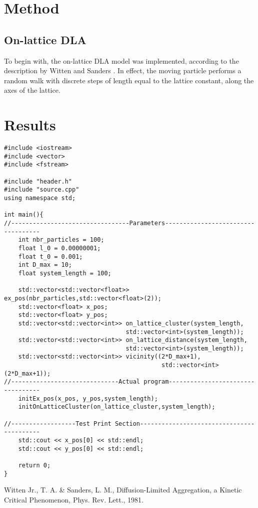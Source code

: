 \documentclass{article}
\begin{document}
\section {Method}
\subsection{On-lattice DLA}
To begin with, the on-lattice DLA model was implemented, according to the description by Witten and Sanders \cite{witten_and_sanders81}. In effect, the moving particle performs a random walk with discrete steps of length equal to the lattice constant, along the axes of the lattice. 

\section{Results}

\begin{lstlisting}
#include <iostream>
#include <vector>
#include <fstream>

#include "header.h"
#include "source.cpp"
using namespace std;

int main(){
//---------------------------------Parameters-----------------------------------
    int nbr_particles = 100;
    float l_0 = 0.00000001; 
    float t_0 = 0.001;
    int D_max = 10;
    float system_length = 100; 

    std::vector<std::vector<float>> ex_pos(nbr_particles,std::vector<float>(2));
    std::vector<float> x_pos;
    std::vector<float> y_pos;
    std::vector<std::vector<int>> on_lattice_cluster(system_length,
                                  std::vector<int>(system_length));
    std::vector<std::vector<int>> on_lattice_distance(system_length,
                                  std::vector<int>(system_length));
    std::vector<std::vector<int>> vicinity((2*D_max+1),
                                            std::vector<int>(2*D_max+1));
//------------------------------Actual program----------------------------------
    initEx_pos(x_pos, y_pos,system_length);
    initOnLatticeCluster(on_lattice_cluster,system_length);
    
//------------------Test Print Section------------------------------------------
    std::cout << x_pos[0] << std::endl;
    std::cout << y_pos[0] << std::endl;

    return 0;
}

\end{lstlisting}


\begin{thebibliography}{99}

Witten Jr., T. A. & Sanders, L. M., Diffusion-Limited Aggregation, a Kinetic Critical Phenomenon, Phys. Rev. Lett., 1981.
\end{thebibliography}
\end{document}
